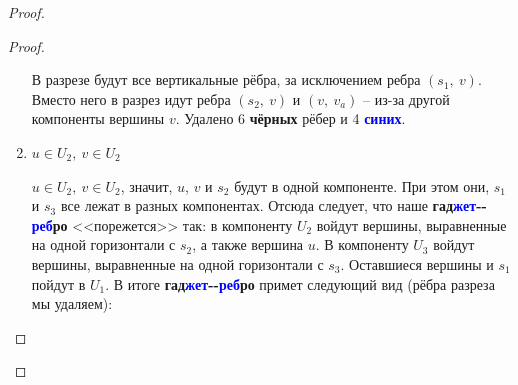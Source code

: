 \documentclass[a4paper,12pt]{article}
\begin{document}
\begin{proof}
\begin{proof}
\begin{enumerate}
            \begin{center}
            \end{center}
            В разрезе будут все вертикальные рёбра, за исключением ребра $(s_1,\ v)$. Вместо него в разрез идут ребра $(s_2,\ v)$ и $(v,\ v_a)$ -- из-за другой компоненты вершины $v$. Удалено 6 \textbf{чёрных} рёбер и 4 \textbf{\textcolor{blue}{синих}}.
            
            \item $u \in U_2,\ v \in U_2$
            
            $u \in U_2,\ v \in U_2$, значит, $u$, $v$ и $s_2$ будут в одной компоненте. При этом они, $s_1$ и $s_3$ все лежат в разных компонентах. Отсюда следует, что наше \textbf{гад}\textbf{\textcolor{blue}{жет}}\textbf{-}\textbf{-}\textbf{\textcolor{blue}{реб}}\textbf{ро} <<порежется>> так: в компоненту $U_2$ войдут вершины, выравненные на одной горизонтали с $s_2$, а также вершина $u$. В компоненту $U_3$ войдут вершины, выравненные на одной горизонтали с $s_3$. Оставшиеся вершины и $s_1$ пойдут в $U_1$. В итоге \textbf{гад}\textbf{\textcolor{blue}{жет}}\textbf{-}\textbf{-}\textbf{\textcolor{blue}{реб}}\textbf{ро} примет следующий вид (рёбра разреза мы удаляем):
            

\end{enumerate}
\end{proof}
\end{proof}
\end{document}
